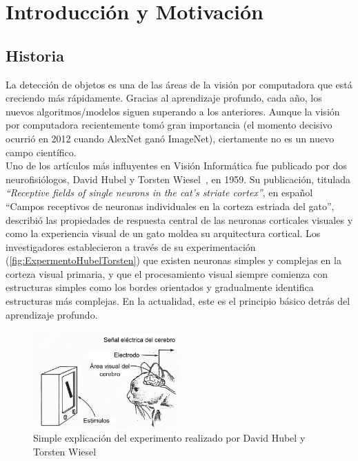 \chapter{Introducción y Motivación} \label{cap:intro}

\section{Historia} \label{sec:historia}
La detección de objetos es una de las áreas de la visión por computadora que está creciendo más rápidamente. Gracias al aprendizaje profundo, cada año, los nuevos algoritmos/modelos siguen superando a los anteriores. Aunque la visión por computadora recientemente tomó gran importancia (el momento decisivo ocurrió en 2012 cuando AlexNet ganó ImageNet), ciertamente no es un nuevo campo científico.\\

Uno de los artículos más influyentes en Visión Informática fue publicado por dos neurofisiólogos, David Hubel y Torsten Wiesel~\cite{hubel1959receptive}, en 1959. Su publicación, titulada \textit{``Receptive fields of single neurons in the cat’s striate cortex''}, en español ``Campos receptivos de neuronas individuales en la corteza estriada del gato'', describió las propiedades de respuesta central de las neuronas corticales visuales y como la experiencia visual de un gato moldea su arquitectura cortical. Los investigadores establecieron a través de su experimentación (\autoref{fig:ExpermentoHubelTorsten}) que existen neuronas simples y complejas en la corteza visual primaria, y que el procesamiento visual siempre comienza con estructuras simples como los bordes orientados y gradualmente identifica estructuras más complejas. En la actualidad, este es el principio básico detrás del aprendizaje profundo.\\

\begin{figure}
	\centering
	\includegraphics[width=0.5\textwidth]{img/cat.jpg}
	\caption{Simple explicación del experimento realizado por David Hubel y Torsten Wiesel}
	\label{fig:ExpermentoHubelTorsten}
\end{figure}

